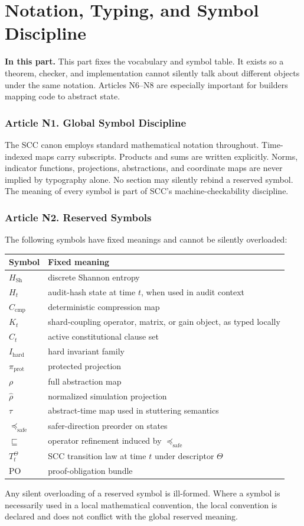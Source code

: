 \documentclass[10pt,oneside]{article}
\theoremstyle{definition}
\theoremstyle{remark}
\newcommand{\Sh}{\mathrm{Sh}}
\newcommand{\PO}{\mathrm{PO}}
\newcommand{\safe}{\mathrm{safe}}
\newcommand{\prot}{\mathrm{prot}}
\newcommand{\cmp}{\mathrm{cmp}}
\newcommand{\PartIntro}[1]{\noindent\textbf{In this part.} #1\par\medskip}
\begin{document}
\part{Notation, Typing, and Symbol Discipline}

\PartIntro{This part fixes the vocabulary and symbol table. It exists so a theorem, checker, and implementation cannot silently talk about different objects under the same notation. Articles N6--N8 are especially important for builders mapping code to abstract state.}

\section{Article N1. Global Symbol Discipline}
The SCC canon employs standard mathematical notation throughout. Time-indexed maps carry subscripts. Products and sums are written explicitly. Norms, indicator functions, projections, abstractions, and coordinate maps are never implied by typography alone. No section may silently rebind a reserved symbol. The meaning of every symbol is part of SCC's machine-checkability discipline.

\section{Article N2. Reserved Symbols}
The following symbols have fixed meanings and cannot be silently overloaded:
\begin{longtable}{p{}p{}}
\toprule
Symbol & Fixed meaning \\
\midrule
\(H_{\Sh}\) & discrete Shannon entropy \\
\(H_t\) & audit-hash state at time \(t\), when used in audit context \\
\(C_{\cmp}\) & deterministic compression map \\
\(K_t\) & shard-coupling operator, matrix, or gain object, as typed locally \\
\(C_t\) & active constitutional clause set \\
\(I_{\mathrm{hard}}\) & hard invariant family \\
\(\pi_{\prot}\) & protected projection \\
\(\rho\) & full abstraction map \\
\(\widehat{\rho}\) & normalized simulation projection \\
\(\tau\) & abstract-time map used in stuttering semantics \\
\(\preceq_{\safe}\) & safer-direction preorder on states \\
\(\sqsubseteq\) & operator refinement induced by \(\preceq_{\safe}\) \\
\(T_t^\Theta\) & SCC transition law at time \(t\) under descriptor \(\Theta\) \\
\(\PO\) & proof-obligation bundle \\
\bottomrule
\end{longtable}
Any silent overloading of a reserved symbol is ill-formed. Where a symbol is necessarily used in a local mathematical convention, the local convention is declared and does not conflict with the global reserved meaning.
\end{document}
